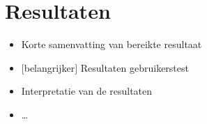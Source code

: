 \chapter{Resultaten}

\begin{itemize}
\item Korte samenvatting van bereikte resultaat
\item $[$belangrijker$]$ Resultaten gebruikerstest
\item Interpretatie van de resultaten
\item \ldots
\end{itemize}